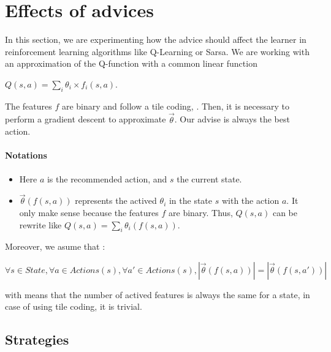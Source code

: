 \documentclass[a4paper,12pt]{article}
\begin{document}
      \newpage
      \section{Effects of advices}
      
      In this section, we are experimenting how the advice should affect the learner in reinforcement
      learning algorithms like Q-Learning or Sarsa.
      We are working with an approximation of the Q-function with a common linear function 
      \begin{footnotesize}
       $Q(s,a) = \sum\limits_{i} \theta_{i} \times f_{i}(s,a)$.
      \end{footnotesize}
      The features $f$ are binary and follow a tile coding, \cite{ReinforceLearningIntro}.
      Then, it is necessary to perform a gradient descent to approximate $\vec\theta$.
      Our advise is always the best action.
      
      
      \paragraph{Notations}
      
\begin{itemize}
 \item Here $a$ is the recommended action, and $s$ the current state.
 \item $\vec\theta(f(s,a))$ represents the actived $\theta_i$ in 
      the state $s$ with the action $a$. It only make sense because the features $f$ are binary.
      Thus, $Q(s,a)$ can be rewrite like $Q(s,a) = \sum\limits_{i} \theta_{i}(f(s,a))$.
\end{itemize}

     
     Moreover, we asume that :
      \begin{center}
	$\forall s \in State, \forall a \in Actions(s), \forall a' \in Actions(s), |\vec\theta (f(s,a))| = | \vec\theta (f(s,a'))|$ 
      \end{center}
      with means that the number of actived features is always the same for a state, in case of using
      tile coding, it is trivial.
      

      
      \subsection{Strategies}
      
\end{document}
